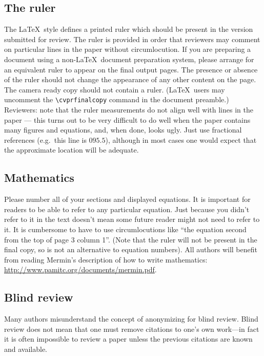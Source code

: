 \documentclass[10pt,twocolumn,letterpaper]{article}
\begin{document}
\subsection{The ruler}
The \LaTeX\ style defines a printed ruler which should be present in the
version submitted for review.  The ruler is provided in order that
reviewers may comment on particular lines in the paper without
circumlocution.  If you are preparing a document using a non-\LaTeX\
document preparation system, please arrange for an equivalent ruler to
appear on the final output pages.  The presence or absence of the ruler
should not change the appearance of any other content on the page.  The
camera ready copy should not contain a ruler. (\LaTeX\ users may uncomment
the \verb'\cvprfinalcopy' command in the document preamble.)  Reviewers:
note that the ruler measurements do not align well with lines in the paper
--- this turns out to be very difficult to do well when the paper contains
many figures and equations, and, when done, looks ugly.  Just use fractional
references (e.g.\ this line is $095.5$), although in most cases one would
expect that the approximate location will be adequate.

\subsection{Mathematics}

Please number all of your sections and displayed equations.  It is
important for readers to be able to refer to any particular equation.  Just
because you didn't refer to it in the text doesn't mean some future reader
might not need to refer to it.  It is cumbersome to have to use
circumlocutions like ``the equation second from the top of page 3 column
1''.  (Note that the ruler will not be present in the final copy, so is not
an alternative to equation numbers).  All authors will benefit from reading
Mermin's description of how to write mathematics:
\url{http://www.pamitc.org/documents/mermin.pdf}.


\subsection{Blind review}

Many authors misunderstand the concept of anonymizing for blind
review.  Blind review does not mean that one must remove
citations to one's own work---in fact it is often impossible to
review a paper unless the previous citations are known and
available.
\end{document}
